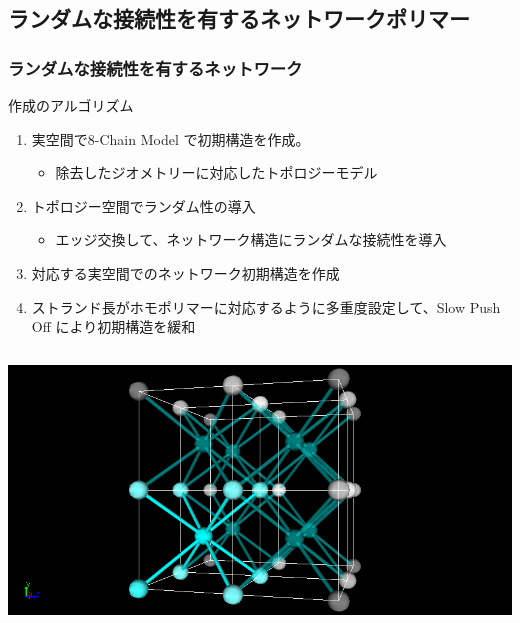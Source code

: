 \documentclass[12pt, dvipdfmx]{beamer}
\begin{document}
\subsection{ランダムな接続性を有するネットワークポリマー}
\begin{frame}
	\frametitle{ランダムな接続性を有するネットワーク}
	\vspace{-1mm}
		\begin{exampleblock}{作成のアルゴリズム}
			\begin{enumerate}
				\item \alert{実空間}で8-Chain Model で初期構造を作成。
					\begin{itemize}
						\item 除去したジオメトリーに対応した\alert{トポロジーモデル}
					\end{itemize}
				\item トポロジー空間でランダム性の導入
					\begin{itemize}
						\item \alert{エッジ交換}して、ネットワーク構造にランダムな接続性を導入
					\end{itemize}	
				\item 対応する\alert{実空間でのネットワーク初期構造}を作成
				\item \alert{ストランド長がホモポリマーに対応}するように多重度設定して、\alert{Slow Push Off により初期構造を緩和}
			\end{enumerate}
		\end{exampleblock}
		\vspace{-1mm}
		\begin{columns}[T, onlytextwidth]
				\includegraphics[width=\textwidth]{8_per.png}

\end{columns}
\end{frame}
\end{document}
